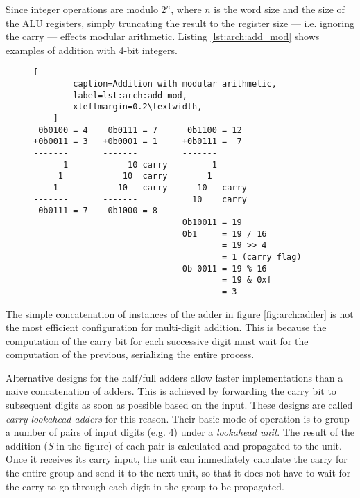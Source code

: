 Since integer operations are modulo $2^n$, where $n$ is the word size and the
size of the ALU registers, simply truncating the result to the register size ---
i.e. ignoring the carry --- effects modular arithmetic.  Listing
\ref{lst:arch:add_mod} shows examples of addition with 4-bit integers.

\begin{figure}[ht]
    \begin{lstlisting}[
        caption=Addition with modular arithmetic,
        label=lst:arch:add_mod,
        xleftmargin=0.2\textwidth,
    ]
 0b0100 = 4    0b0111 = 7      0b1100 = 12
+0b0011 = 3   +0b0001 = 1     +0b0111 =  7
-------       -------         -------
      1            10 carry         1
     1            10  carry        1
    1            10   carry      10   carry
-------       -------           10    carry
 0b0111 = 7    0b1000 = 8     -------
                              0b10011 = 19
                              0b1     = 19 / 16
                                      = 19 >> 4
                                      = 1 (carry flag)
                              0b 0011 = 19 % 16
                                      = 19 & 0xf
                                      = 3
    \end{lstlisting}
\end{figure}

\begin{aside}
    The simple concatenation of instances of the adder in figure
    \ref{fig:arch:adder} is not the most efficient configuration for multi-digit
    addition.  This is because the computation of the carry bit for each
    successive digit must wait for the computation of the previous, serializing
    the entire process.

    Alternative designs for the half/full adders allow faster implementations
    than a naive concatenation of adders.  This is achieved by forwarding the
    carry bit to subsequent digits as soon as possible based on the input.
    These designs are called \textit{carry-lookahead adders} for this reason.
    Their basic mode of operation is to group a number of pairs of input digits
    (e.g. 4) under a \textit{lookahead unit}.  The result of the addition
    (\textit{S} in the figure) of each pair is calculated and propagated to the
    unit.  Once it receives its carry input, the unit can immediately calculate
    the carry for the entire group and send it to the next unit, so that it does
    not have to wait for the carry to go through each digit in the group to be
    propagated.
\end{aside}
